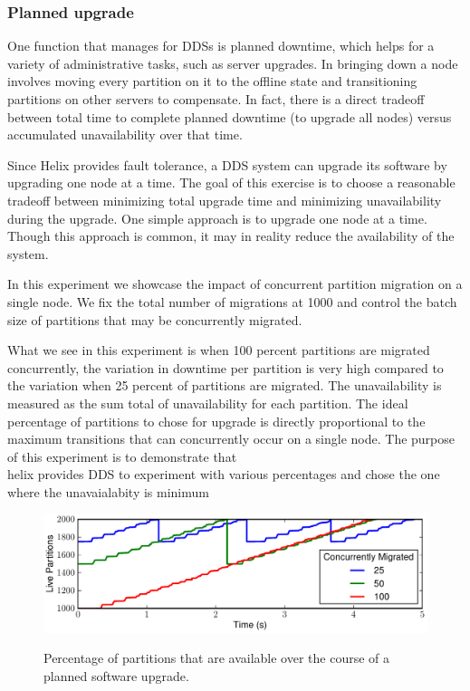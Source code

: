 \subsubsection{Planned upgrade}
\label{sec:downtime}
%
One function that \helix manages for DDSs is planned downtime, which helps for a
variety of administrative tasks, such as server upgrades.  In \ES bringing down
a node involves moving every partition on it to the offline state and
transitioning partitions on other servers to compensate. In fact, there
is a direct tradeoff between total time to complete planned downtime (\eg to
upgrade all nodes) versus accumulated unavailability over that time. 

Since Helix provides fault tolerance, a DDS system can upgrade its software by upgrading one node at a time. 
The goal of this exercise is to choose a reasonable tradeoff between minimizing
total upgrade time and minimizing unavailability during the upgrade. 
One simple approach is to upgrade one node at a time. 
Though this approach is common, it may in reality reduce the availability of the
system. 

In this experiment we showcase the impact of concurrent partition migration on a
single node. We fix the total number of migrations at 1000 and control the
batch size of partitions that may be concurrently migrated. 

What we see in this experiment is when 100 percent partitions are migrated
 concurrently, the variation in downtime per partition is very high compared to
 the variation when 25 percent of partitions are migrated. The unavailability is
 measured as the sum total of unavailability for each partition. The ideal
 percentage of partitions to chose for upgrade is directly proportional to the
 maximum transitions that can concurrently occur on a single node. The purpose
 of this experiment is to demonstrate that \\helix provides DDS to experiment
 with various percentages and chose the one where the unavaialabity is minimum

\begin{figure}[t]
    {\includegraphics[width=\columnwidth]{migration-timeseries.pdf}}
    \vspace*{-2ex}
    \caption{\label{fig:migration_timeseries} Percentage of partitions that are
available over the course of a planned software upgrade.}
\end{figure}


